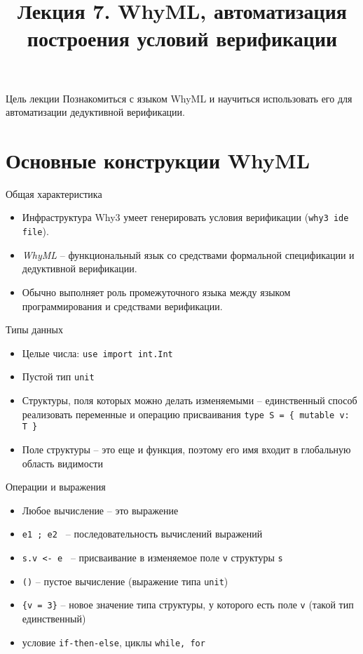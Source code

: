 \documentclass[hyperref={unicode=true}]{beamer}
\title{Лекция 7. WhyML, автоматизация построения условий верификации}
\author{}
\date{}
\begin{document}
	\begin{frame}{}
		\titlepage
	\end{frame}

    \begin{frame}{Цель лекции}
    Познакомиться с языком WhyML и
    научиться использовать его для
    автоматизации дедуктивной верификации.
    \end{frame}

    \section{Основные конструкции WhyML}

    \begin{frame}{Общая характеристика}
    \begin{itemize}
    \item
    Инфраструктура Why3 умеет генерировать
    условия верификации (\texttt{why3 ide file}).
    \item
    \textsl{WhyML} -- функциональный язык
    со средствами формальной спецификации и
    дедуктивной верификации.
    \item
    Обычно выполняет роль промежуточного языка
    между языком программирования и средствами
    верификации.
    \end{itemize}
    \end{frame}

    \begin{frame}{Типы данных}
    \begin{itemize}
    \item
    Целые числа: \texttt{use import int.Int}
    \item
    Пустой тип \texttt{unit}
    \item
    Структуры, поля которых можно делать изменяемыми --
    единственный способ реализовать переменные и операцию
    присваивания \texttt{type S = \{ mutable v: T \}}
    \item
    Поле структуры -- это еще и функция, поэтому его имя
    входит в глобальную область видимости
    \end{itemize}
    \end{frame}

    \begin{frame}{Операции и выражения}
    \begin{itemize}
    \item
    Любое вычисление -- это выражение
    \item
    \texttt{e1 ; e2 } -- последовательность вычислений выражений
    \item
    \texttt{s.v <- e } -- присваивание в изменяемое поле
    \texttt{v} структуры \texttt{s}
    \item
    \texttt{()} -- пустое вычисление (выражение типа \texttt{unit})
    \item
    \texttt{\{v = 3\}} -- новое значение типа структуры, у которого
    есть поле \texttt{v} (такой тип единственный)
    \item
    условие \texttt{if-then-else}, циклы \texttt{while, for}
    \end{itemize}
    \end{frame}
\end{document}
